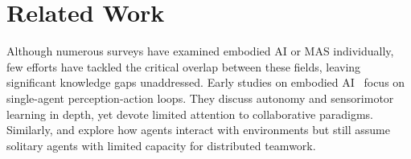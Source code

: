 \section{Related Work}






Although numerous surveys have examined embodied AI or MAS individually, few efforts have tackled the critical overlap between these fields, leaving significant knowledge gaps unaddressed.
Early studies on embodied AI~\cite{hu2023toward,firoozi2023foundation,ma2024survey} focus on single-agent perception-action loops. 
They discuss autonomy and sensorimotor learning in depth, yet devote limited attention to collaborative paradigms. 
Similarly, \cite{duan2022survey} and \cite{liu2024aligning} explore how agents interact with environments but still assume solitary agents with limited capacity for distributed teamwork.

